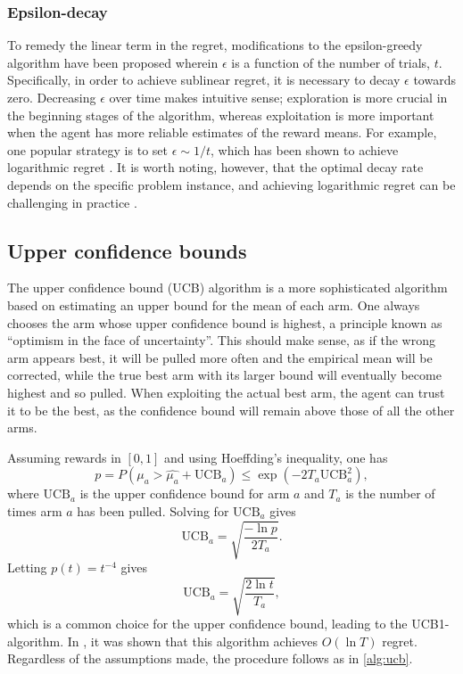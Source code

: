 \subsubsection{Epsilon-decay}
To remedy the linear term in the regret, modifications to the epsilon-greedy algorithm have been proposed wherein $\epsilon$ is a function of the number of trials, $t$.
Specifically, in order to achieve sublinear regret, it is necessary to decay $\epsilon$ towards zero.
Decreasing $\epsilon$ over time makes intuitive sense; exploration is more crucial in the beginning stages of the algorithm, whereas exploitation is more important when the agent has more reliable estimates of the reward means.
For example, one popular strategy is to set $\epsilon \sim 1/t$, which has been shown to achieve logarithmic regret \cite{auer2002}.
It is worth noting, however, that the optimal decay rate depends on the specific problem instance, and achieving logarithmic regret can be challenging in practice \cite{bubeck2012}.

\subsection{Upper confidence bounds}
The upper confidence bound (UCB) algorithm is a more sophisticated algorithm based on estimating an upper bound for the mean of each arm.
One always chooses the arm whose upper confidence bound is highest, a principle known as \enquote{optimism in the face of uncertainty}.
This should make sense, as if the wrong arm appears best, it will be pulled more often and the empirical mean will be corrected, while the true best arm with its larger bound will eventually become highest and so pulled.
When exploiting the actual best arm, the agent can trust it to be the best, as the confidence bound will remain above those of all the other arms.

Assuming rewards in $[0,1]$ and using Hoeffding's inequality, one has
\begin{equation}
    p
    = P \left(\mu_a > \hat{\mu_a} + \text{UCB}_a \right)
    \leq \exp \left(-2T_a \text{UCB}_a^2 \right),
\end{equation}
where $\text{UCB}_a$ is the upper confidence bound for arm $a$ and $T_a$ is the number of times arm $a$ has been pulled.
Solving for $\text{UCB}_a$ gives
\begin{equation}
    \text{UCB}_a = \sqrt{\frac{-\ln p}{2T_a}}.
\end{equation}
Letting $p(t) = t^{-4}$ gives
\begin{equation}
    \text{UCB}_a = \sqrt{\frac{2 \ln t}{T_a}},
\end{equation}
which is a common choice for the upper confidence bound, leading to the UCB1-algorithm.
In \cite{auer2002}, it was shown that this algorithm achieves $O(\ln T)$ regret.
Regardless of the assumptions made, the procedure follows as in \cref{alg:ucb}.

